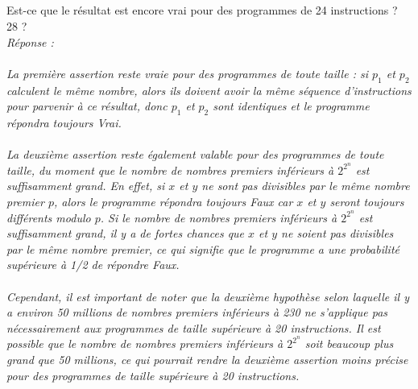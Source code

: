 \documentclass[a4paper,11pt]{article}
\begin{document}
        \subsection{}\label{subsec:Q8}
        Est-ce que le résultat est encore vrai pour des programmes de 24 instructions ? 28 ?\\\textit{Réponse : \\\\
            La première assertion reste vraie pour des programmes de toute taille : si $p_1$ et $p_2$ calculent le même nombre, alors ils doivent avoir la même séquence d'instructions pour parvenir à ce résultat, donc $p_1$ et $p_2$ sont identiques et le programme répondra toujours Vrai.\\\\
La deuxième assertion reste également valable pour des programmes de toute taille, du moment que le nombre de nombres premiers inférieurs à $2^{2^{n}}$ est suffisamment grand. En effet, si $x$ et $y$ ne sont pas divisibles par le même nombre premier $p$, alors le programme répondra toujours Faux car $x$ et $y$ seront toujours différents modulo $p$. Si le nombre de nombres premiers inférieurs à $2^{2^{n}}$ est suffisamment grand, il y a de fortes chances que $x$ et $y$ ne soient pas divisibles par le même nombre premier, ce qui signifie que le programme a une probabilité supérieure à 1/2 de répondre Faux.\\\\
Cependant, il est important de noter que la deuxième hypothèse selon laquelle il y a environ 50 millions de nombres premiers inférieurs à 230 ne s'applique pas nécessairement aux programmes de taille supérieure à 20 instructions. Il est possible que le nombre de nombres premiers inférieurs à $2^{2^{n}}$ soit beaucoup plus grand que 50 millions, ce qui pourrait rendre la deuxième assertion moins précise pour des programmes de taille supérieure à 20 instructions.}
\end{document}
